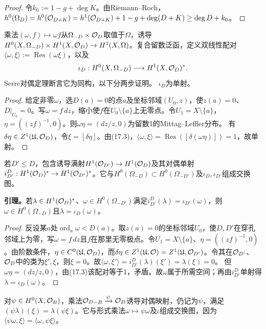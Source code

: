 \begin{proof}
令$k_0:=1-g+\deg K$。由Riemann--Roch，$h^0(\Omega_D)=h^0(\mathcal O_{D+K})=h^1(\mathcal O_{D+K})+1-g+\deg(D+K)\ge\deg D+k_0$。
\end{proof}
乘法$(\omega,f)\mapsto\omega f$从$\Omega_{-D}\times\mathcal O_D$取值于$\Omega$，诱导$H^0(X,\Omega_{-D})\times H^1(X,\mathcal O_D)\to H^1(X,\Omega)$。复合留数泛函，定义双线性配对$\langle\omega,\xi\rangle:=\operatorname{Res}(\omega\xi)$，以及
\[
\iota_D:H^0(X,\Omega_{-D})\longrightarrow H^1(X,\mathcal O_D)^*.
\]
Serre对偶定理断言它为同构，以下分两步证明。
$\iota_D$为单射。
\begin{proof}
给定非零$\omega$，选$D(a)=0$的点$a$及坐标邻域$(U_0,z)$，使$z(a)=0$、$D|_{U_0}=0$。写$\omega=f\,dz$，缩小使$f$在$U_0\setminus\{a\}$上无零点。令$U_1=X\setminus\{a\}$，$\eta=((zf)^{-1},0)$。则$\omega\eta=(dz/z,0)$为留数1的Mittag--Leffler分布。
有$\delta\eta\in Z^1(\mathfrak U,\mathcal O_D)$，令$\xi=[\delta\eta]$。由(17.3)，$\langle\omega,\xi\rangle=\operatorname{Res}([\delta(\omega\eta)])=1$，故单射。
\end{proof}
若$D'\le D$，包含诱导满射$H^1(\mathcal O_{D'})\to H^1(\mathcal O_D)$及其对偶单射$i_{D'}^D:H^1(\mathcal O_D)^*\to H^1(\mathcal O_{D'})^*$。它与$H^0(\Omega_{-D})\subset H^0(\Omega_{-D'})$及$\iota_D,\iota_{D'}$组成交换图。

\textbf{引理。}若$\lambda\in H^1(\mathcal O_D)^*$、$\omega\in H^0(\Omega_{-D'})$满足$i_{D'}^D(\lambda)=\iota_{D'}(\omega)$，则$\omega\in H^0(\Omega_{-D})$且$\lambda=\iota_D(\omega)$。
\begin{proof}
反设某$a$处$\operatorname{ord}_a\omega<D(a)$。取$z(a)=0$的坐标邻域$U_0$，使$D,D'$在穿孔邻域上为零，写$\omega=f\,dz$且$f$在那里无零极点。令$U_1=X\setminus\{a\}$、$\eta=((zf)^{-1},0)$。由阶数条件，$\eta\in C^0(\mathfrak U,\mathcal O_D)$，而$\delta\eta\in Z^1(\mathfrak U,\mathcal O)=Z^1(\mathfrak U,\mathcal O_{D'})$。令其在$\mathcal O_{D'}$、$\mathcal O_D$中的类为$\xi',\xi$，则$\xi=0$。故$\langle\omega,\xi'\rangle=i_{D'}^D(\lambda)(\xi')=\lambda(\xi)=0$。
但$\omega\eta=(dz/z,0)$，由(17.3)该配对等于1，矛盾。故$\omega$属于所需空间；再由$i_{D'}^D$单射得$\lambda=\iota_D(\omega)$。
\end{proof}
对$\psi\in H^0(X,\mathcal O_B)$，乘法$\mathcal O_{D-B}\xrightarrow\psi\mathcal O_D$诱导对偶映射，仍记为$\psi$，满足$(\psi\lambda)(\xi)=\lambda(\psi\xi)$。它与形式乘法$\omega\mapsto\psi\omega$及$\iota$组成交换图，因为$\langle\psi\omega,\xi\rangle=\langle\omega,\psi\xi\rangle$。

